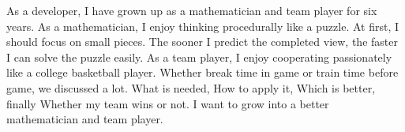 

\begin{cvparagraph}

As a developer, I have grown up as a mathematician and team player for six years.
As a mathematician, I enjoy thinking procedurally like a puzzle.
At first, I should focus on small pieces.
The sooner I predict the completed view, the faster I can solve the puzzle easily.
As a team player, I enjoy cooperating passionately like a college basketball player.
Whether break time in game or train time before game, we discussed a lot.
What is needed, How to apply it, Which is better, finally Whether my team wins or not.
I want to grow into a better mathematician and team player.
\end{cvparagraph}

